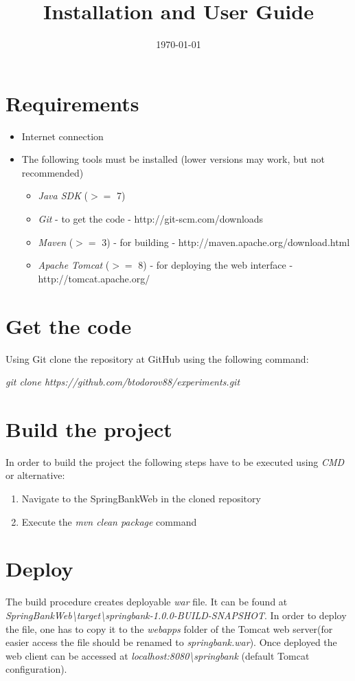 \documentclass[a4paper, notitlepage]{article}
\begin{document}
\title{Installation and User Guide} 
\date{\today}
\maketitle



\section{Requirements}

\begin{itemize}
	\item Internet connection
	\item The following tools must be installed (lower versions may work, but not recommended)
	\begin{itemize}
		\item \textit{Java SDK} ($>=$ 7)
		\item \textit{Git} - to get the code - http://git-scm.com/downloads
		\item \textit{Maven} ($>=$ 3) - for building - http://maven.apache.org/download.html
		\item \textit{Apache Tomcat} ($>=$ 8) - for deploying the web interface - http://tomcat.apache.org/
	\end{itemize}
\end{itemize}

\section{Get the code}
Using Git clone the repository at GitHub using the following command:

\textit{git clone https://github.com/btodorov88/experiments.git}

\section{Build the project}

In order to build the project the following steps have to be executed using \textit{CMD} or alternative:
\begin{enumerate}
	\item Navigate to the SpringBankWeb in the cloned repository
	\item Execute the \textit{mvn clean package} command
\end{enumerate}

\section{Deploy}
The build procedure creates deployable \textit{war} file. It can be found at \textit{SpringBankWeb\textbackslash target\textbackslash springbank-1.0.0-BUILD-SNAPSHOT}. In order to deploy the file, one has to copy it to the \textit{webapps} folder of the Tomcat web server(for easier access the file should be renamed to \textit{springbank.war}). Once deployed the web client can be accessed at \textit{localhost:8080\textbackslash springbank} (default Tomcat configuration).
\end{document}
